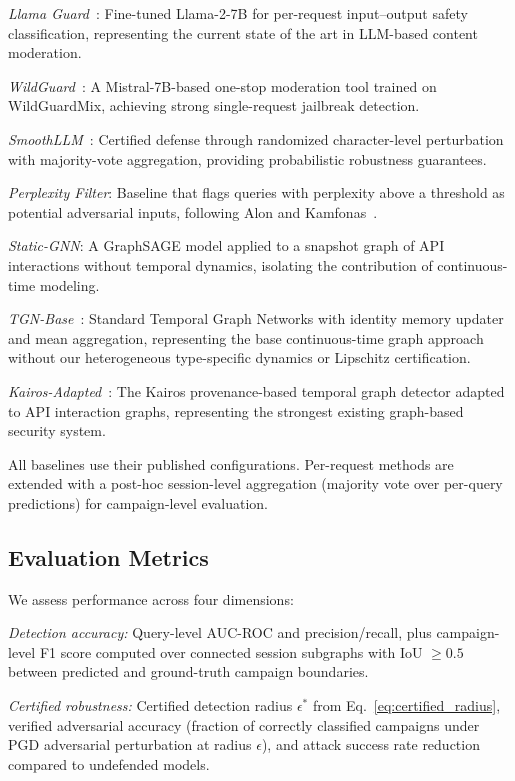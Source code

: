 \documentclass[journal]{IEEEtran}
\theoremstyle{plain}
\theoremstyle{definition}
\theoremstyle{remark}
\begin{document}
\textit{Llama Guard}~\cite{inan2023llamaguard}: Fine-tuned Llama-2-7B for per-request input--output safety classification, representing the current state of the art in LLM-based content moderation.

\textit{WildGuard}~\cite{han2024wildguard}: A Mistral-7B-based one-stop moderation tool trained on WildGuardMix, achieving strong single-request jailbreak detection.

\textit{SmoothLLM}~\cite{robey2024smoothllm}: Certified defense through randomized character-level perturbation with majority-vote aggregation, providing probabilistic robustness guarantees.

\textit{Perplexity Filter}: Baseline that flags queries with perplexity above a threshold as potential adversarial inputs, following Alon and Kamfonas~\cite{alon2023perplexity}.

\textit{Static-GNN}: A GraphSAGE model applied to a snapshot graph of API interactions without temporal dynamics, isolating the contribution of continuous-time modeling.

\textit{TGN-Base}~\cite{rossi2020tgn}: Standard Temporal Graph Networks with identity memory updater and mean aggregation, representing the base continuous-time graph approach without our heterogeneous type-specific dynamics or Lipschitz certification.

\textit{Kairos-Adapted}~\cite{cheng2024kairos}: The Kairos provenance-based temporal graph detector adapted to API interaction graphs, representing the strongest existing graph-based security system.

All baselines use their published configurations. Per-request methods are extended with a post-hoc session-level aggregation (majority vote over per-query predictions) for campaign-level evaluation.

\subsection{Evaluation Metrics}

We assess performance across four dimensions:

\textit{Detection accuracy:} Query-level AUC-ROC and precision/recall, plus campaign-level F1 score computed over connected session subgraphs with IoU $\geq 0.5$ between predicted and ground-truth campaign boundaries.

\textit{Certified robustness:} Certified detection radius $\epsilon^*$ from Eq.~\eqref{eq:certified_radius}, verified adversarial accuracy (fraction of correctly classified campaigns under PGD adversarial perturbation at radius $\epsilon$), and attack success rate reduction compared to undefended models.
\end{document}
